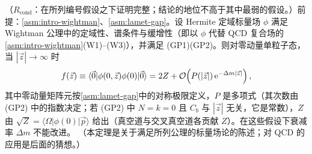 \begin{theorem}\label{thm:lamet-exp-decay}
（$R_{\mathrm{cond}}$：在所列编号假设之下证明完整；结论的地位不高于其中最弱的假设。）前提：\cref{asm:intro-wightman}、\cref{asm:lamet-gap}。设 Hermite 定域标量场 $\phi$ 满足 Wightman 公理中的定域性、谱条件与缓增性（即以 $\phi$ 代替 QCD 复合场的\cref{asm:intro-wightman}(W1)--(W3)），并满足 (GP1)(GP2)。则对零动量单粒子态，当 $|\vec z|\to\infty$ 时
\begin{equation}\label{eq:lamet-expdecay}
f(\vec z)\equiv\langle\vec 0|\phi(0,\vec z)\phi(0)|\vec 0\rangle=2Z+\mathcal{O}\!\left(P(|\vec z|)\,\mathrm{e}^{-\Delta m|\vec z|}\right),
\end{equation}%
其中零动量矩阵元按\cref{asm:lamet-gap}中的对称极限定义，$P$ 是多项式（其次数由 (GP2) 中的指数决定；若 (GP2) 中 $N=k=0$ 且 $C_b$ 与 $|\vec z|$ 无关，它是常数），$Z$ 由 $\sqrt Z=\langle\Omega|\phi(0)|\vec p\rangle$ 给出（真空道与交叉真空道各贡献 $Z$）。在这些假设下衰减率 $\Delta m$ 不能改进。
（本定理是关于满足所列公理的标量场论的陈述；对 QCD 的应用是后面的猜想。）
\end{theorem}

